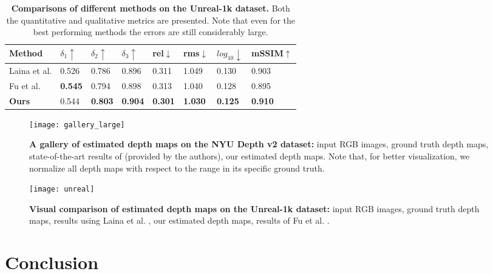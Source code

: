 \documentclass[10pt,twocolumn,letterpaper]{article}
\begin{document}
\begin{table*}[t]
\centering
\begin{tabular}{l|lll|lll|l}
\toprule
Method         & $\delta_{1}\uparrow$ & $\delta_{2}\uparrow$ & $\delta_{3}\uparrow$ & rel$\downarrow$   & rms$\downarrow$   & $log_{10}\downarrow$ & mSSIM$\uparrow$  \\ 
\midrule
Laina et al. \cite{Laina2016}    & 0.526   &  0.786  & 0.896  & 0.311  & 1.049  &  0.130 & 0.903 \\
Fu et al. \cite{Fu2018DeepOR}    & \textbf{0.545} &  0.794  & 0.898  & 0.313  & 1.040  & 0.128 & 0.895 \\
\textbf{Ours}                    & 0.544  &  \textbf{0.803}  &  \textbf{0.904} & \textbf{0.301}  &  \textbf{1.030}  & \textbf{0.125} & \textbf{0.910}  \\
\bottomrule
\end{tabular}
\bigskip
\caption{\textbf{Comparisons of different methods on the Unreal-1k dataset.} Both the quantitative and qualitative metrics are presented. Note that even for the best performing methods the errors are still considerably large.}
\label{tab:3}
\end{table*}


\begin{figure*}[t]
\begin{center}
\texttt{[image: gallery\_large]}
\end{center}
   \caption{\textbf{A gallery of estimated depth maps on the NYU Depth v2 dataset:} input RGB images, ground truth depth maps, state-of-the-art results of \cite{Fu2018DeepOR} (provided by the authors), our estimated depth maps. Note that, for better visualization, we normalize all depth maps with respect to the range in its specific ground truth. }
\label{fig:gallery}
\end{figure*}



\begin{figure*}[t]
\begin{center}
\texttt{[image: unreal]}
\end{center}
   \caption{\textbf{Visual comparison of estimated depth maps on the Unreal-1k dataset:} input RGB images, ground truth depth maps, results using Laina et al. \cite{Laina2016}, our estimated depth maps, results of Fu et al. \cite{Fu2018DeepOR}.}
\label{fig:unreal}
\end{figure*}


\section{Conclusion}
\end{document}
